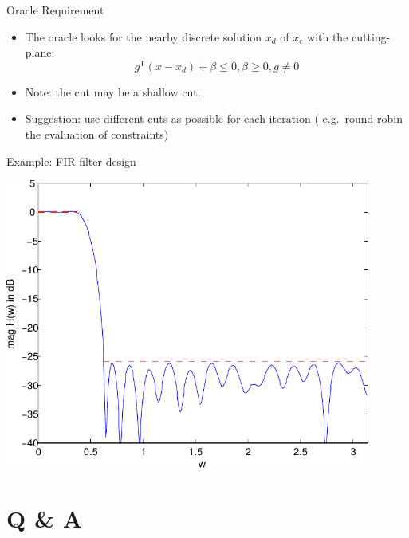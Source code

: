 \documentclass[10pt,ignorenonframetext,serif,onlymath]{beamer}
\begin{document}
\begin{frame}{Oracle Requirement}
\protect\hypertarget{oracle-requirement}{}

\begin{itemize}
\item
  The oracle looks for the nearby discrete solution \(x_d\) of \(x_c\)
  with the cutting-plane:
  \[g^\mathsf{T} (x - x_d) + \beta \leq 0, \beta \geq 0, g \neq 0\]
\item
  Note: the cut may be a shallow cut.
\item
  Suggestion: use different cuts as possible for each iteration (
  e.g.~round-robin the evaluation of constraints)
\end{itemize}

\end{frame}

\begin{frame}{Example: FIR filter design}
\protect\hypertarget{example-fir-filter-design-1}{}

\includegraphics[width=0.9\textwidth,height=\textheight]{ellipsoid.files/lowpass_ripple.pdf}

\end{frame}

\hypertarget{q-a}{%
\section{Q \& A}\label{q-a}}
\end{document}
